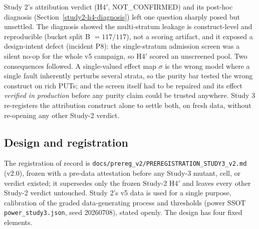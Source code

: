 \documentclass[manuscript,screen,review]{acmart}
\begin{document}
Study 2's attribution verdict (H4\('\), NOT\_CONFIRMED) and its post-hoc
diagnosis (Section~\ref{study2-h4-diagnosis}) left one question sharply posed
but unsettled. The diagnosis showed the multi-stratum leakage is
construct-level and reproducible (bucket split B \(=117/117\)), not a scoring
artifact, and it exposed a design-intent defect (incident P8): the
single-stratum admission screen was a silent no-op for the whole v5 campaign,
so H4\('\) scored an unscreened pool. Two consequences followed. A single-valued
effect map \(\sigma\) is the wrong model where a single fault inherently
perturbs several strata, so the purity bar tested the wrong construct on rich
PUTs; and the screen itself had to be repaired and its effect \emph{verified in
production} before any purity claim could be trusted anywhere. Study 3
re-registers the attribution construct alone to settle both, on fresh data,
without re-opening any other Study-2 verdict.

\subsection{Design and registration}\label{study3-design}

The registration of record is
\texttt{docs/prereg\_v2/PREREGISTRATION\_STUDY3\_v2.md} (v2.0), frozen with a
pre-data attestation before any Study-3 mutant, cell, or verdict existed; it
supersedes only the frozen Study-2 H4\('\) and leaves every other Study-2
verdict untouched. Study 2's v5 data is used for a single purpose, calibration
of the graded data-generating process and thresholds (power SSOT
\texttt{power\_study3.json}, seed 20260708), stated openly. The design has four
fixed elements.
\end{document}
